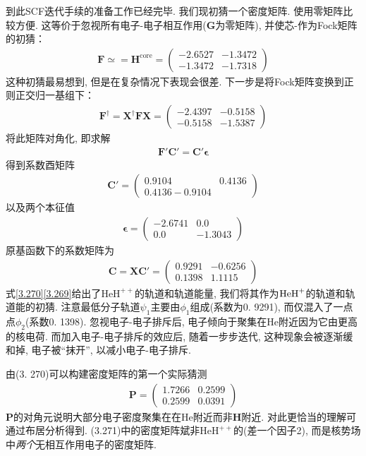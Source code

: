 到此SCF迭代手续的准备工作已经完毕. 
我们现初猜一个密度矩阵. 
使用零矩阵比较方便. 
这等价于忽视所有电子-电子相互作用($\mathbf{G}$为零矩阵), 
并使芯-\ha 作为Fock矩阵的初猜：
\begin{align}
	\mathbf{F}\simeq=\mathbf{H}^\mathrm{core}=
	\begin{pmatrix}
		-2.6527&-1.3472\\-1.3472&-1.7318
	\end{pmatrix}
\end{align}
这种初猜最易想到, 
但是在复杂情况下表现会很差. 
下一步是将Fock矩阵变换到正则正交归一基组下：
\begin{align}
	\mathbf{F^\dagger=X^\dagger FX}=
	\begin{pmatrix}
		-2.4397&-0.5158\\-0.5158&-1.5387
	\end{pmatrix}
\end{align}
将此矩阵对角化, 
即求解
\begin{align}
	\mathbf{F'C'=C'}{\boldsymbol\epsilon}
\end{align}
得到系数酉矩阵
\begin{align}
	\mathbf{C'}=
	\begin{pmatrix}
		0.9104&0.4136\\0.4136-0.9104
	\end{pmatrix}
\end{align}
以及两个本征值
\begin{align}
	\label{3.269}
	\bm{\epsilon}=
	\begin{pmatrix}
		-2.6741&0.0\\0.0&-1.3043
	\end{pmatrix}
\end{align}
原基函数下的系数矩阵为
\begin{align}
	\mathbf{C=XC'}=
	\begin{pmatrix}
		0.9291&-0.6256\\0.1398&1.1115
	\end{pmatrix}
	\label{3.270}
\end{align}
式\eqref{3.270}\eqref{3.269}给出了$\mathrm{HeH}^{++}$的轨道和轨道能量, 
我们将其作为$\mathrm{HeH}^+$的轨道和轨道能的初猜. 
注意最低分子轨道$\psi_1$主要由$\phi_1$组成(系数为0.
9291), 
而仅混入了一点点$\phi_2$(系数0.
1398). 
忽视电子-电子排斥后, 
电子倾向于聚集在$\mathrm{He}$附近因为它由更高的核电荷. 
而加入电子-电子排斥的效应后, 
随着一步步迭代, 
这种现象会被逐渐缓和掉, 
电子被``抹开”, 
以减小电子-电子排斥.


由(3.
270)可以构建密度矩阵的第一个实际猜测
\begin{align}
	\mathbf{P}=
	\begin{pmatrix}
		1.7266&0.2599\\0.2599&0.0391
	\end{pmatrix}
\end{align}
$\mathbf{P}$的对角元说明大部分电子密度聚集在在$\mathrm{He}$附近而非$\mathbf{H}$附近. 
对此更恰当的理解可通过布居分析得到. 
(3.271)中的密度矩阵斌非$\mathrm{HeH}^{++}$的(差一个因子2), 而是核势场中\emph{两个}无相互作用电子的密度矩阵.

